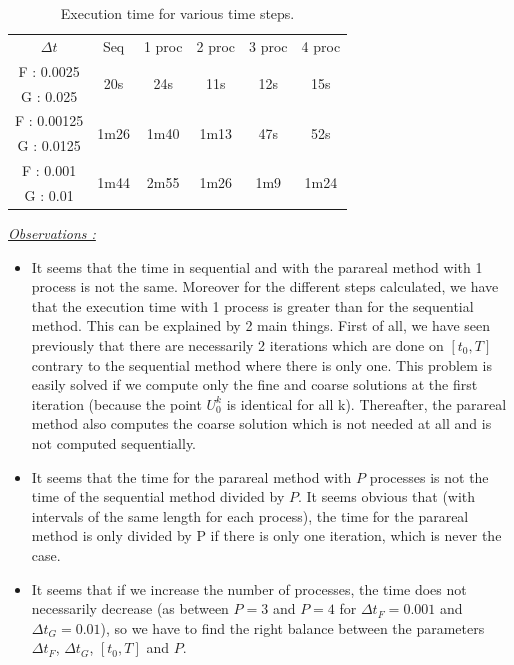 \begin{table}[H]
	\centering
	\begin{tabular}{| c || c | c | c | c | c |}
		\hline
		\multirow{2}{1.5 cm}{$\Delta t$} & \multirow{2}{1.5 cm}{Seq} & \multirow{2}{1.5 cm}{1 proc} & \multirow{2}{1.5 cm}{2 proc} & \multirow{2}{1.5 cm}{3 proc} &\multirow{2}{1.5 cm}{4 proc} \\
		& & & & & \\
		\hline 
		F : 0.0025 & \multirow{2}{1.5 cm}{20s} & \multirow{2}{1.5 cm}{24s} & \multirow{2}{1.5 cm}{11s} & \multirow{2}{1.5 cm}{12s} & \multirow{2}{1.5 cm}{15s} \\
		G : 0.025 & & & & & \\
		\hline 
		F : 0.00125 & \multirow{2}{1.5 cm}{1m26} & \multirow{2}{1.5 cm}{1m40} & \multirow{2}{1.5 cm}{1m13} & \multirow{2}{1.5 cm}{47s} & \multirow{2}{1.5 cm}{52s} \\
		G : 0.0125 & & & & & \\
		\hline 
		F : 0.001 & \multirow{2}{1.5 cm}{1m44} & \multirow{2}{1.5 cm}{2m55} & \multirow{2}{1.5 cm}{1m26} & \multirow{2}{1.5 cm}{1m9} & \multirow{2}{1.5 cm}{1m24} \\
		G : 0.01 & & & & & \\	 
		\hline
	\end{tabular}
	\caption{Execution time for various time steps.}
	\label{time}
\end{table}

\noindent \underline{\textit{Observations :}} 

\begin{itemize}[label=-]
	\item It seems that the time in sequential and with the parareal method with 1 process is not the same. Moreover for the different steps calculated, we have that the execution time with 1 process is greater than for the sequential method. This can be explained by 2 main things. First of all, we have seen previously that there are necessarily 2 iterations which are done on $[t_0,T]$ contrary to the sequential method where there is only one. This problem is easily solved if we compute only the fine and coarse solutions at the first iteration (because the point $U_0^k$ is identical for all k). Thereafter, the parareal method also computes the coarse solution which is not needed at all and is not computed sequentially.
	\item It seems that the time for the parareal method with $P$ processes is not the time of the sequential method divided by $P$. It seems obvious that (with intervals of the same length for each process), the time for the parareal method is only divided by P if there is only one iteration, which is never the case.
	\item It seems that if we increase the number of processes, the time does not necessarily decrease (as between $P=3$ and $P=4$ for $\Delta t_F=0.001$ and $\Delta t_G=0.01$), so we have to find the right balance between the parameters $\Delta t_F$, $\Delta t_G$, $[t_0,T]$ and $P$.
\end{itemize}

